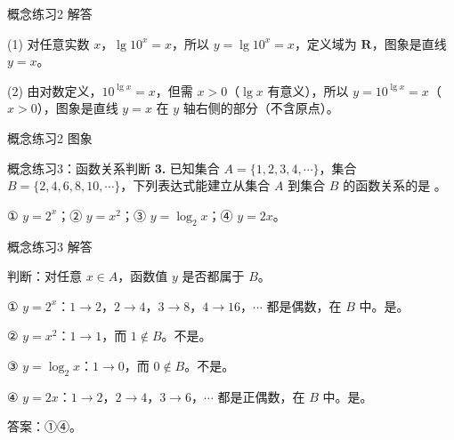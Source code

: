 \documentclass[10pt,aspectratio=169,serif]{beamer}
\begin{document}
\begin{frame}[t]{概念练习2 解答}
\begin{tcolorbox}[colback=orange!10,colframe=orange,title=\textbf{解}]
(1) 对任意实数 $x$，$\lg 10^x = x$，所以 $y = \lg 10^x = x$，定义域为 $\mathbf{R}$，图象是直线 $y=x$。

(2) 由对数定义，$10^{\lg x} = x$，但需 $x>0$（$\lg x$ 有意义），所以 $y = 10^{\lg x} = x$（$x>0$），图象是直线 $y=x$ 在 $y$ 轴右侧的部分（不含原点）。
\end{tcolorbox}
\end{frame}

\begin{frame}[t]{概念练习2 图象}
\begin{center}
\end{center}
\end{frame}

\begin{frame}[t]{概念练习3：函数关系判断}
\textbf{3.} 已知集合 $A = \{1, 2, 3, 4, \cdots\}$，集合 $B = \{2, 4, 6, 8, 10, \cdots\}$，下列表达式能建立从集合 $A$ 到集合 $B$ 的函数关系的是 \underline{\hspace{2em}}。

\vspace{1em}
\hspace{2em}① $y = 2^x$；\hspace{2em}② $y = x^2$；\hspace{2em}③ $y = \log_2 x$；\hspace{2em}④ $y = 2x$。
\end{frame}

\begin{frame}[t]{概念练习3 解答}
\begin{tcolorbox}[colback=orange!10,colframe=orange,title=\textbf{解}]
判断：对任意 $x\in A$，函数值 $y$ 是否都属于 $B$。

\vspace{0.3em}
① $y=2^x$：$1\to 2$，$2\to 4$，$3\to 8$，$4\to 16$，$\cdots$ 都是偶数，在 $B$ 中。\alert{是}。

② $y=x^2$：$1\to 1$，而 $1\notin B$。\alert{不是}。

③ $y=\log_2 x$：$1\to 0$，而 $0\notin B$。\alert{不是}。

④ $y=2x$：$1\to 2$，$2\to 4$，$3\to 6$，$\cdots$ 都是正偶数，在 $B$ 中。\alert{是}。

\vspace{0.3em}
\alert{答案：①④}。
\end{tcolorbox}
\end{frame}
\end{document}
